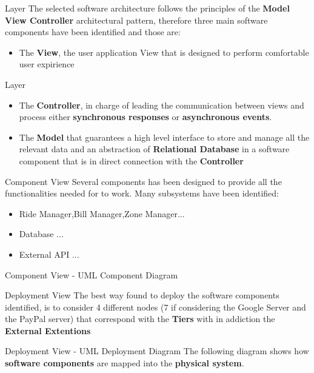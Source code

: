 \documentclass{../Common/Structure/pdf_presentation}
\begin{document}
	\begin{frame}{Layer}
		The selected software architecture follows the principles of the \textbf{Model View Controller} architectural pattern, therefore three main software components have been identified and those are:
		\begin{itemize}
			\item The \textbf{View}, the user application View that is designed to perform comfortable user expirience
		\end{itemize}
	\end{frame}
	\begin{frame}{Layer}
		\begin{itemize}
			\item The \textbf{Controller}, in charge of leading the communication between views and process either \textbf{synchronous responses} or \textbf{asynchronous events}.
			\item The \textbf{Model} that guarantees a high level interface to store and manage all the \PowerEnJoy{} relevant data and an abstraction of \textbf{Relational Database} in a software component that is in direct connection with the \textbf{Controller}
		\end{itemize}
	\end{frame}
	\begin{frame}{Component View}
		Several components has been designed to provide all the functionalities needed for \PowerEnJoy{} to work.
		Many subsystems have been identified:
		\begin{itemize}
			\item Ride Manager,Bill Manager,Zone Manager...
			\item Database ...
			\item External API ...
		\end{itemize}
	\end{frame}
	\begin{frame}{Component View - UML Component Diagram}
	\end{frame}
	\begin{frame}{Deployment View}
			The best way found to deploy the software components identified, is to consider 4 different nodes (7 if considering the Google Server and the
			PayPal server) that correspond with the \textbf{Tiers} with in addiction the \textbf{External Extentions}
	\end{frame}
	\begin{frame}{Deployment View - UML Deployment Diagram}
		The following diagram shows how \textbf{software components} are mapped into the \textbf{physical system}.
	\end{frame}
\end{document}
